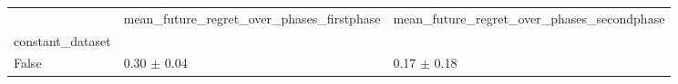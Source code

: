 \begin{tabular}{lll}
\toprule
 & mean_future_regret_over_phases_firstphase & mean_future_regret_over_phases_secondphase \\
constant_dataset &  &  \\
\midrule
False & 0.30 $\pm$ 0.04 & 0.17 $\pm$ 0.18 \\
\bottomrule
\end{tabular}
